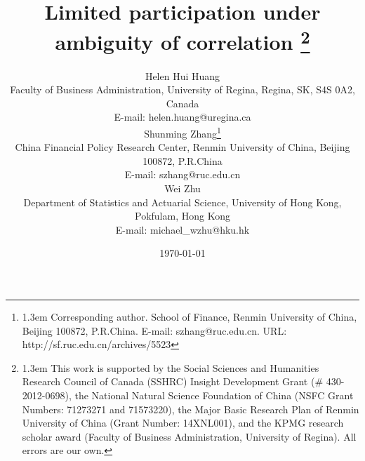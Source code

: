 \documentclass[10pt]{article}
\begin{document}
\countdef{}
\overfullrule=0pt

\title{Limited participation under ambiguity of correlation
\footnote{\baselineskip1.3em This work is supported by the Social Sciences and Humanities Research Council of Canada (SSHRC) Insight Development Grant ($\#$ 430-2012-0698), the National Natural Science Foundation of China (NSFC Grant Numbers: 71273271 and 71573220), the Major Basic Research Plan of Renmin University of China (Grant Number: 14XNL001), and the KPMG research scholar award (Faculty of Business Administration, University of Regina). All errors are our own.}}
\author{{\small Helen Hui Huang} \\ {\small Faculty of Business Administration, University of Regina, Regina, SK, S4S 0A2, Canada} \\ {\small E-mail: helen.huang@uregina.ca} \\ {\small Shunming Zhang}\footnote{\baselineskip1.3em Corresponding author. School of Finance, Renmin University of China, Beijing 100872, P.R.China. E-mail: szhang@ruc.edu.cn. URL: http://sf.ruc.edu.cn/archives/5523} \\ {\small China Financial Policy Research Center, Renmin University of China, Beijing 100872, P.R.China} \\ {\small E-mail: szhang@ruc.edu.cn} \\ {\small Wei Zhu} \\ {\small Department of Statistics and Actuarial Science, University of Hong Kong, Pokfulam, Hong Kong} \\ {\small E-mail: michael\_wzhu@hku.hk}}
\date{\today}
\maketitle
\end{document}
